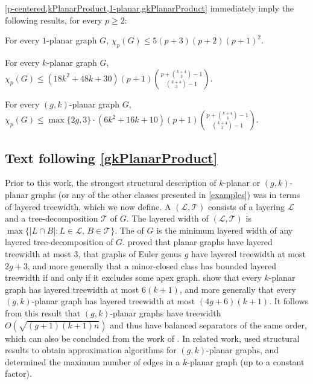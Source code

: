 
 \cref{p-centered,kPlanarProduct,1-planar,gkPlanarProduct} immediately imply the following results, for every $p\ge 2$:

 \begin{cor}\quad
 \begin{compactitem}
 \item For every $1$-planar graph $G$,\; $ \chi_p(G)\le 5 (p+3)(p+2)(p+1)^2$.
 \item For every $k$-planar graph $G$,\; $\displaystyle \chi_p(G)\le (18k^2+48k+30)(p+1) \binom{p+ \binom{k+4}{3}-1}{ \binom{k+4}{3}-1}$.
 \item For every $(g,k)$-planar graph $G$,\;
 $\displaystyle \chi_p(G) \le \max\{2g,3\}\cdot(6k^2+16k+10) (p+1) \binom{p+\binom{k+4}{3}-1}{\binom{k+4}{3}-1}$.
  \end{compactitem}
 \end{cor}

 \subsection{Text following \cref{gkPlanarProduct}}

 Prior to this work, the strongest structural description of $k$-planar or $(g,k)$-planar graphs (or any of the other classes presented in \cref{examples}) was in terms of layered treewidth, which we now define.  A  $(\mathcal{L},\mathcal{T})$ consists of a layering $\mathcal{L}$ and a tree-decomposition $\mathcal{T}$ of $G$. The layered width of $(\mathcal{L},\mathcal{T})$ is $\max\{|L\cap B|: L\in \mathcal{L},\, B\in \mathcal{T}\}$.  The  of $G$ is the minimum layered width of any layered tree-decomposition of $G$. \citet{dujmovic.morin.ea:layered} proved that planar graphs have layered treewidth at most 3, that graphs of Euler genus $g$ have layered treewidth at most $2g+3$, and more generally that a minor-closed class has bounded layered treewidth if and only if it excludes some apex graph. \citet{dujmovic.eppstein.ea:structure} show that every $k$-planar graph has layered treewidth at most $6(k+1)$, and more generally that every $(g,k)$-planar graph has layered treewidth at most $(4g+6)(k+1)$. It follows from this result that $(g,k)$-planar graphs have treewidth $O(\sqrt{(g+1)(k+1)n})$ and thus have balanced separators of the same order, which can also be concluded from the work of \citet{FP08}. In related work, \citet{grigoriev.bodlaender:algorithms} used structural results to obtain approximation algorithms for $(g,k)$-planar graphs, and \citet{PachToth97} determined the maximum number of edges in a $k$-planar graph (up to a constant factor).

